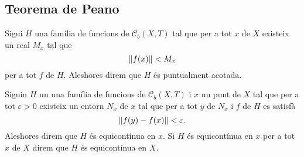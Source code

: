 \documentclass[../Apunts.tex]{subfiles}
\begin{document}
	\subsection{Teorema de Peano}
	\begin{definition}
		\label{def:família de funcions puntualment acotada}
		Sigui \(H\) una família de funcions de \(\mathcal{C}_{b}(X,T)\) tal que per a tot \(x\) de \(X\) existeix un real \(M_{x}\) tal que
		\[\norm{f(x)}<M_{x}\]
		per a tot \(f\) de \(H\). Aleshores direm que \(H\) és puntualment acotada.
	\end{definition}
	\begin{definition}
		\label{def:família de funcions equicontínua en un punt}
		\label{def:família de funcions equicontínua}
		Siguin \(H\) un una família de funcions de \(\mathcal{C}_{b}(X,T)\) i \(x\) un punt de \(X\) tal que per a tot \(\varepsilon>0\) existeix un entorn \(N_{x}\) de \(x\) tal que per a tot \(y\) de \(N_{x}\) i \(f\) de \(H\) es satisfà
		\[\norm{f(y)-f(x)}<\varepsilon.\]
		Aleshores direm que \(H\) és equicontínua en \(x\). Si \(H\) és equicontínua en \(x\) per a tot \(x\) de \(X\) direm que \(H\) és equicontínua en \(X\).
	\end{definition}
\end{document}
